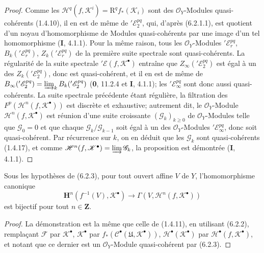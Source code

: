 \begin{proof}
Comme les $\mathscr H^q(f,\mathscr K^i)=\mathrm R^q f_*(\mathscr K_i)$ sont
des $\mathscr O_Y$-Modules quasi-cohérents (1.4.10), il en est de même de
$'\mathscr E_2^{pq}$, qui, d'après (6.2.1.1), est quotient d'un noyau
d'homomorphisme de Modules quasi-cohérents par une image d'un tel
homomorphisme (\textbf{I}, 4.1.1). Pour la même raison, tous les
$\mathscr O_Y$-Modules $'\mathscr E_r^{pq}$,
$B_k('\mathscr E_r^{pq})$, $Z_k('\mathscr E_r^{pq})$ de la première suite
spectrale sont quasi-cohérents. La régularité de la suite spectrale
$'\mathscr E(f,\mathscr K^\bullet)$ entraîne que
$Z_\infty('\mathscr E_2^{pq})$ est égal à un des
$Z_k('\mathscr E_2^{pq})$, donc est quasi-cohérent, et il en est de même de
$B_\infty('\mathscr E_2^{pq})=\varinjlim_k B_k('\mathscr E_2^{pq})$
(\textbf{0}, 11.2.4 et \textbf{I}, 4.1.1); les $'\mathscr E_\infty^{pq}$ sont donc aussi
quasi-cohérents. La suite spectrale précédente étant régulière, la filtration
des $F^p(\mathscr H^n(f,\mathscr K^\bullet))$ est discrète et exhaustive;
autrement dit, le $\mathscr O_Y$-Module
$\mathscr H^n(f,\mathscr K^\bullet)$ est réunion d'une suite croissante
$(\mathscr G_k)_{k\geq0}$ de $\mathscr O_Y$-Modules telle que
$\mathscr G_0=0$ et que chaque $\mathscr G_k/\mathscr G_{k-1}$ soit égal à un
des $\mathscr O_Y$-Modules $'\mathscr E_\infty^{pq}$, donc soit
quasi-cohérent. Par récurrence sur $k$, on en déduit que les $\mathscr G_k$
sont quasi-cohérents (1.4.17), et comme
$\mathscr H^n(f,\mathscr K^\bullet)=\varinjlim\mathscr G_k$, la proposition
est démontrée (\textbf{I}, 4.1.1).
\end{proof}


\begin{corollary}[6.2.4]
Sous les hypothèses de (6.2.3), pour tout ouvert affine $V$ de $Y$,
l'homomorphisme canonique
\[
  \mathbf H^n(f^{-1}(V),\mathscr K^\bullet)
  \longrightarrow
  \Gamma(V,\mathscr H^n(f,\mathscr K^\bullet))
  \tag{6.2.4.1}\label{III.6.2.4.1.fr}
\]
est bijectif pour tout $n\in\mathbf Z$.
\end{corollary}

\begin{proof}
La démonstration est la même que celle de (1.4.11), en utilisant (6.2.2),
remplaçant $\mathscr F$ par $\mathscr K^\bullet$,
$\mathscr K^\bullet$ par
$f_*(\mathscr C^\bullet(\mathfrak U,\mathscr K^\bullet))$,
$\mathscr H^\bullet(\mathscr K^\bullet)$ par
$\mathscr H^\bullet(f,\mathscr K^\bullet)$, et notant que ce dernier est un
$\mathscr O_Y$-Module quasi-cohérent par (6.2.3).
\end{proof}

